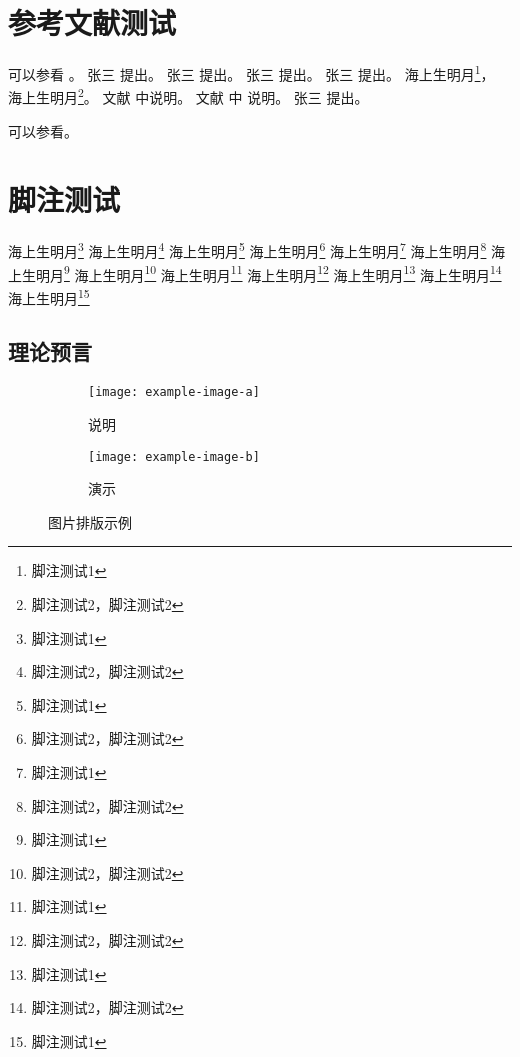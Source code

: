 \section{参考文献测试}

可以参看 \parencite{Weng:2017jyh,Biro:2017flp,Hod:2017ssh}。
张三 \cite{叶普1993关于对瞬心的动量矩定理}提出。
张三 \parencite{爱因斯坦文集2009}提出。
张三 \cite{叶普1993关于对瞬心的动量矩定理}提出。
张三 \cite{叶普1993关于对瞬心的动量矩定理,2003张量分析,lanczos1986variational}提出。
海上生明月\footnote{脚注测试1}，
海上生明月\footnote{脚注测试2，脚注测试2}。
文献 \cite{2003张量分析}中说明。
文献 \cite{叶普1993关于对瞬心的动量矩定理,2003张量分析,lanczos1986variational}中 说明。
张三 \parencite{爱因斯坦文集2009,叶普1993关于对瞬心的动量矩定理,2003张量分析,lanczos1986variational}提出。

可以参看\cite{Litvinova:2017jnd,Li:2017kdj}。



\section{脚注测试}%

\zhlipsum[2-3]
海上生明月\footnote{脚注测试1}
海上生明月\footnote{脚注测试2，脚注测试2}
海上生明月\footnote{脚注测试1}
海上生明月\footnote{脚注测试2，脚注测试2}
海上生明月\footnote{脚注测试1}
海上生明月\footnote{脚注测试2，脚注测试2}
海上生明月\footnote{脚注测试1}
海上生明月\footnote{脚注测试2，脚注测试2}
海上生明月\footnote{脚注测试1}
海上生明月\footnote{脚注测试2，脚注测试2}
海上生明月\footnote{脚注测试1}
海上生明月\footnote{脚注测试2，脚注测试2}
海上生明月\footnote{脚注测试1}


\subsection{理论预言}%



\zhlipsum[3]


\begin{figure}[h!]
	\centering
	\begin{subfigure}{0.4\linewidth}
		\centering
		\texttt{[image: example-image-a]}
		\caption{说明}\label{}
	\end{subfigure}
	\hfil
	\begin{subfigure}{0.4\linewidth}
		\centering
		\texttt{[image: example-image-b]}
		\caption{演示}\label{}
	\end{subfigure}
	\caption{图片排版示例}
\end{figure}

